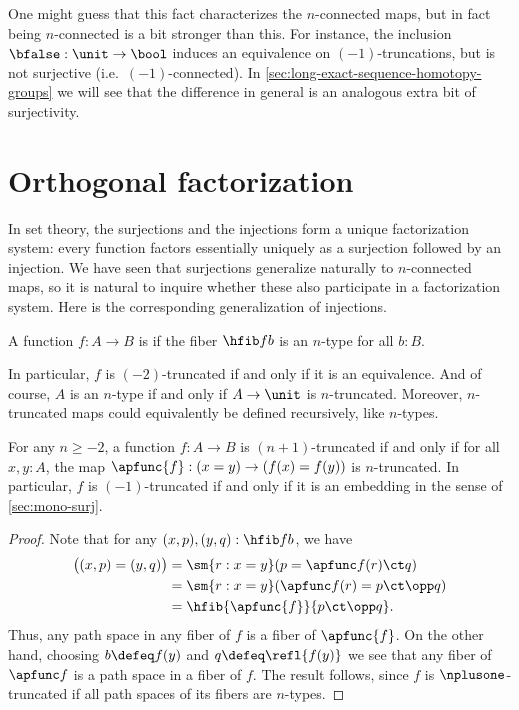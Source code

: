 One might guess that this fact characterizes the $n$-connected maps, but in fact being $n$-connected is a bit stronger than this.
For instance, the inclusion $\bfalse:\unit \to\bool$ induces an equivalence on $(-1)$-truncations, but is not surjective (i.e.\ $(-1)$-connected).
In \cref{sec:long-exact-sequence-homotopy-groups} we will see that the difference in general is an analogous extra bit of surjectivity.


\section{Orthogonal factorization}
\label{sec:image-factorization}

%
%
In set theory, the surjections and the injections form a unique factorization system: every function factors essentially uniquely as a surjection followed by an injection.
We have seen that surjections generalize naturally to $n$-connected maps, so it is natural to inquire whether these also participate in a factorization system.
Here is the corresponding generalization of injections.

\begin{defn}
  A function $f:A\to B$ is 
if the fiber $\hfib f b$ is an $n$-type for all $b:B$.
\end{defn}

In particular, $f$ is $(-2)$-truncated if and only if it is an equivalence.
And of course, $A$ is an $n$-type if and only if $A\to\unit$ is $n$-truncated.
Moreover, $n$-truncated maps could equivalently be defined recursively, like $n$-types.

\begin{lem}\label{thm:modal-mono}
  For any $n\ge -2$, a function $f:A\to B$ is $(n+1)$-truncated if and only if for all $x,y:A$, the map $\apfunc{f}:(x=y) \to (f(x)=f(y))$ is $n$-truncated.
  In particular, $f$ is $(-1)$-truncated if and only if it is an embedding in the sense of \cref{sec:mono-surj}.
\end{lem}
\begin{proof}
  Note that for any $(x,p),(y,q):\hfib f b$, we have
  \begin{align*}
    \big((x,p) = (y,q)\big)
    &= \sm{r:x=y} (p = \apfunc f(r)\ct q)\\
    &= \sm{r:x=y} (\apfunc f (r) = p\ct \opp q)\\
    &= \hfib{\apfunc{f}}{p\ct \opp q}.
  \end{align*}
  Thus, any path space in any fiber of $f$ is a fiber of $\apfunc{f}$.
  On the other hand, choosing $b\defeq f(y)$ and $q\defeq \refl{f(y)}$ we see that any fiber of $\apfunc f$ is a path space in a fiber of $f$.
  The result follows, since $f$ is $\nplusone$-truncated if all path spaces of its fibers are $n$-types.
\end{proof}

